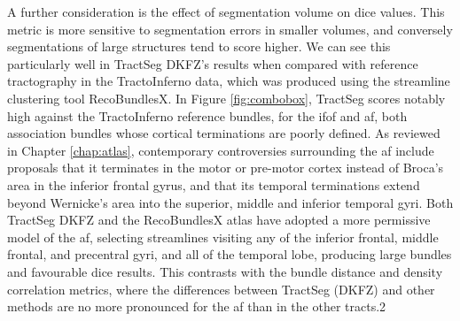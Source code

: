 A further consideration is the effect of segmentation volume on \gls{dice} values.
This metric is more sensitive to segmentation errors in smaller volumes, and conversely segmentations of large structures tend to score higher.
We can see this particularly well in TractSeg DKFZ's results when compared with reference tractography in the TractoInferno data, which was produced using the streamline clustering tool RecoBundlesX\autocite{Garyfallidis2018,Rheault2020a}.
In Figure \ref{fig:combobox}, TractSeg scores notably high against the TractoInferno reference bundles, for the \gls{ifof} and \gls{af}, both association bundles whose cortical terminations are poorly defined.
As reviewed in Chapter \ref{chap:atlas}, contemporary controversies surrounding the \gls{af} include proposals that it terminates in the motor or pre-motor cortex instead of Broca's area in the inferior frontal gyrus, and that its temporal terminations extend beyond Wernicke's area into the superior, middle and inferior temporal gyri\autocite{Dick2012,Giampiccolo2022a}.
Both TractSeg DKFZ\autocite{Wasserthal2018c} and the RecoBundlesX atlas\autocite{Rheault2021} have adopted a more permissive model of the \gls{af}, selecting streamlines visiting any of the inferior frontal, middle frontal, and precentral gyri, and all of the temporal lobe, producing large bundles and favourable \gls{dice} results.
This contrasts with the bundle distance and density correlation metrics, where the differences between TractSeg (DKFZ) and other methods are no more pronounced for the \gls{af} than in the other tracts.2

